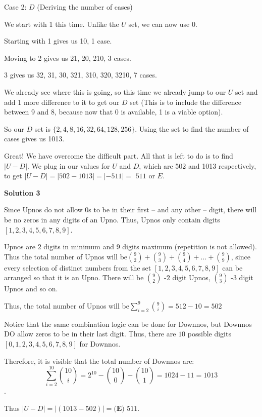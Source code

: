 \begin{enumerate}
 Case 2: \( D \) (Deriving the number of cases)

 We start with 1 this time. Unlike the \( U \) set, we can now use 0.

 Starting with 1 gives us 10, 1 case.

 Moving to 2 gives us 21, 20, 210, 3 cases.

 3 gives us 32, 31, 30, 321, 310, 320, 3210, 7 cases.

 We already see where this is going, so this time we already jump to our \( U \) set and add 1 more difference to it to get our \( D \) set (This is to include the difference between 9 and 8, because now that 0 is available, 1 is a viable option).

 So our  \( D \) set is \( \{2, 4, 8,16,32,64,128,256\} \). Using the set to find the number of cases gives us 1013.

 Great! We have overcome the difficult part. All that is left to do is to find \( |U-D| \). We plug in our values for \( U \) and \( D \), which are 502 and 1013 respectively, to get \( |U-D| = |502-1013| = |-511| =\) $\boxed{511}$ or $\boxed{E}$.

 



\textbf{Solution 3}

Since Upnos do not allow $0$s to be in their first -- and any other -- digit, there will be no zeros in any digits of an Upno. Thus, Upnos only contain digits $[1,2,3,4,5,6,7,8,9]$. 

 Upnos are $2$ digits in minimum and $9$ digits maximum (repetition is not allowed). Thus the total number of Upnos will be${9\choose 2}+{9\choose 3}+ {9\choose 4}+...+{9\choose 9}$, since every selection of distinct numbers from the set $[1,2,3,4,5,6,7,8,9]$ can be arranged so that it is an Upno. There will be ${9\choose 2}$ -$2$ digit Upnos, ${9\choose 3}$ -$3$ digit Upnos and so on.

 Thus, the total number of Upnos will be$\sum_{i=2}^{9}{{9 \choose i}}=512-10=502$

 Notice that the same combination logic can be done for Downnos, but Downnos DO allow zeros to be in their last digit. Thus, there are $10$ possible digits $[0,1,2,3,4,5,6,7,8,9]$ for Downnos. 

 Therefore, it is visible that the total number of Downnos are:
 \[\sum_{i=2}^{10}{{10\choose i}}= 2^{10}-{10\choose 0}-{10\choose 1} = 1024 - 11 = 1013\].

 Thus $|U-D| = |(1013-502)| =\boxed{\textbf{(E) }511}.$





\end{enumerate}

